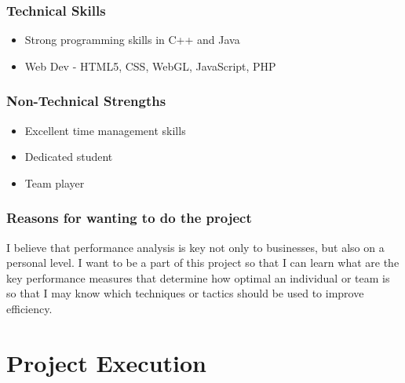 \documentclass[a4paper,12pt]{article}
\begin{document}
\subsubsection{Technical Skills}
\begin{itemize}
    \item Strong programming skills in C++ and Java
    \item Web Dev - HTML5, CSS, WebGL, JavaScript, PHP
\end{itemize}
\subsubsection{Non-Technical Strengths}
\begin{itemize}
    \item Excellent time management skills
    \item Dedicated student
    \item Team player
\end{itemize}
\subsubsection{Reasons for wanting to do the project}
I believe that performance analysis is key not only to businesses, but also on a personal level. I want to be a part of this project so that I can learn what are the key performance measures that determine how optimal an 
individual or team is so that I may know which techniques or tactics should be used to improve efficiency.
\section{Project Execution}
\end{document}
